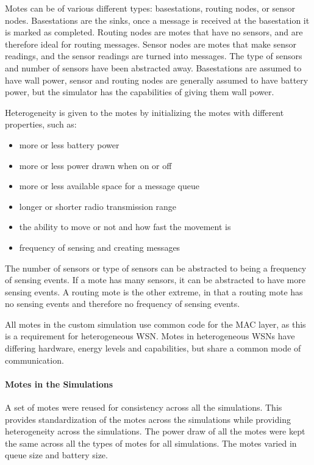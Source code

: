 Motes can be of various different types: basestations, routing nodes, or sensor nodes. Basestations
are the sinks, once a message is received at the basestation it is marked as completed.  Routing nodes
are motes that have no sensors, and are therefore ideal  for routing messages. Sensor nodes are
motes that make sensor readings, and the sensor readings are turned into messages. The type
of sensors and number of sensors have been abstracted away. Basestations are assumed to have wall power, sensor and routing 
nodes are generally assumed to have battery power, but the simulator has the capabilities of giving them wall power.

Heterogeneity is given to the motes by initializing the motes with different properties, such as:
\begin{itemize} 
	\item more or less battery power 
	\item more or less power drawn when on or off 
	\item more or less available space for a message queue
	\item longer or shorter radio transmission range
	\item the ability to move or not and how fast the movement is
	\item frequency of sensing and creating messages
\end{itemize}

The number of sensors or type of sensors can be abstracted to being a frequency of sensing events. If a mote has many sensors, 
it can be abstracted to have more sensing events. A routing mote is the other extreme, in that a routing mote has 
no sensing events and therefore no frequency of sensing events.

All motes in the custom simulation use common code for the MAC layer, as this is a requirement for heterogeneous WSN. Motes in heterogeneous
WSNs have differing hardware, energy levels and capabilities, but share a common mode of communication.

\paragraph{Motes in the Simulations}

A set of motes were reused for consistency across all the simulations. This provides 
standardization of the motes across the simulations while providing heterogeneity across
the simulations. The power draw of all the motes were kept the same across all the types of motes
for all simulations. The motes varied in queue size and battery size.

